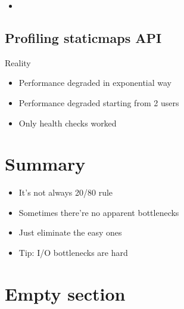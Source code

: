 \documentclass[16pt]{beamer}
\begin{document}
\begin{frame}{}
  \begin{itemize}
  \item \rightarrow{}
  \end{itemize}
\end{frame}

\subsection{Profiling staticmaps API}

\begin{frame}{Reality}
  \begin{itemize}
  \item Performance degraded in exponential way
  \item Performance degraded starting from 2 users
  \item Only health checks worked
  \end{itemize}
\end{frame}

\section*{Summary}

\begin{frame}{}
  \begin{itemize}
  \item It's not always 20/80 rule
  \item Sometimes there're no apparent bottlenecks
  \item Just eliminate the easy ones
  \item Tip: I/O bottlenecks are hard
  \end{itemize}
\end{frame}

\section{Empty section}
\end{document}
